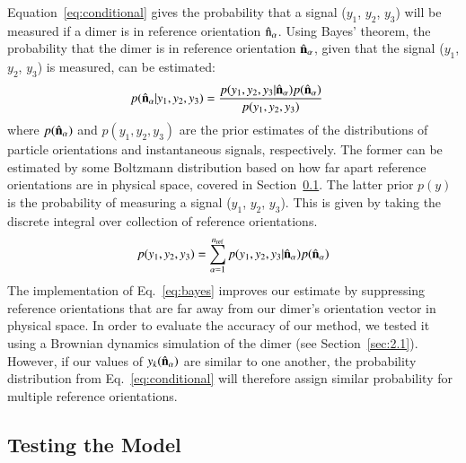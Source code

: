 \documentclass[final, 3p]{elsarticle}
\begin{document}
Equation~\eqref{eq:conditional} gives the probability that a signal
($y_1$, $y_2$, $y_3$) will be measured if a dimer is in reference
orientation $\hat{\rm n}_\alpha$.
%
Using Bayes' theorem, the probability that the dimer is in reference
orientation $\hat{\bf n}_\alpha$, given that the signal ($y_1$, $y_2$,
$y_3$) is measured, can be estimated:
%
%
%
\begin{align}
  \label{eq:bayes}
  p(\hat{\bf n}_\alpha| y_1,y_2,y_3)
  &=
    \frac{p(y_1,y_2,y_3|\hat{\bf n}_\alpha)
    p(\hat{\bf n}_\alpha)}{p(y_1, y_2, y_3)}
\end{align}
where $p(\hat{\bf n}_\alpha)$ and $p(y_1, y_2, y_3)$ are the prior
estimates of the distributions of particle orientations and
instantaneous signals, respectively.
%
The former can be estimated by some Boltzmann distribution based on
how far apart reference orientations are in physical space, covered in
Section~\ref{sec:2.3}.  The latter prior $p(y)$ is the probability of
measuring a signal ($y_1$, $y_2$, $y_3$).  This is given by taking the
discrete integral over collection of reference orientations.
\begin{align}
  p(y_1, y_2, y_3)
  =
  \sum_{\alpha=1}^{n_{\rm ref}}
  p(y_1, y_2, y_3|\hat{\bf n}_\alpha)
  p(\hat{\bf n}_\alpha)
\end{align}
The implementation of Eq.~\eqref{eq:bayes} improves our estimate by
suppressing reference orientations that are far away from our dimer's
orientation vector in physical space.  In order to evaluate the
accuracy of our method, we tested it using a Brownian dynamics
simulation of the dimer (see Section~\ref{sec:2.1}).
%
%
However, if our values of $y_k(\hat{\bf n}_\alpha)$
are similar to one another, the probability distribution from
Eq.~\eqref{eq:conditional} will therefore assign similar probability
for multiple reference orientations.



\subsection{Testing the Model}
\label{sec:2.3}
\end{document}

